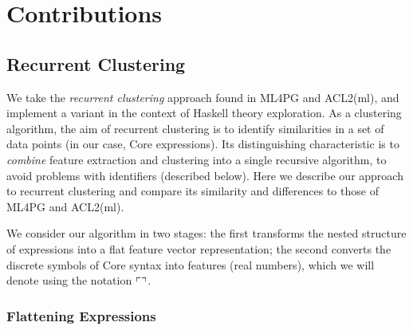 \section{Contributions}
\label{sec:contributions}

\subsection{Recurrent Clustering}
\label{sec:recurrentclustering}

\iffalse TODO: Much of this discussion reads as a minor implementation solution rather than an overview of the whole method \fi

\iffalse TODO: Focus the section more on the problem of identifiers, and how recurrent clustering uses clustering as part of feature extraction to solve this \fi

\iffalse TODO: Maybe present the translation from trees to matrices, to vectors first; leaving the conversion of terms to features until afterwards; similar to how ML4PG uses [foo] to mean ``the feature corresponding to foo, whatever that might be'' \fi

\iffalse TODO: Maybe present recurrent clustering in a ``naive'' way: define the conversion function ``[]'' recursively. Leave the dependency-ordering, etc. for the Algorithm section, as a way of ``building up to'' the result, which avoids the inefficiencies of recursing. \fi

We take the \emph{recurrent clustering} approach found in ML4PG and ACL2(ml), and implement a variant in the context of Haskell theory exploration. As a clustering algorithm, the aim of recurrent clustering is to identify similarities in a set of data points (in our case, Core expressions). Its distinguishing characteristic is to \emph{combine} feature extraction and clustering into a single recursive algorithm, to avoid problems with identifiers (described below). Here we describe our approach to recurrent clustering and compare its similarity and differences to those of ML4PG and ACL2(ml).

We consider our algorithm in two stages: the first transforms the nested structure of expressions into a flat feature vector representation; the second converts the discrete symbols of Core syntax into features (real numbers), which we will denote using the notation $\left\ulcorner  \right\urcorner$.

\subsubsection{Flattening Expressions}


